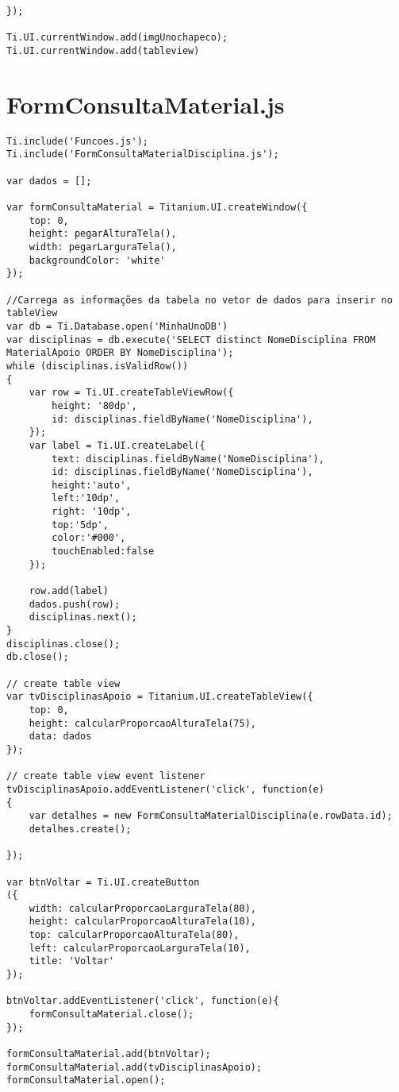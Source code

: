 \begin{lstlisting}
});

Ti.UI.currentWindow.add(imgUnochapeco);
Ti.UI.currentWindow.add(tableview)
\end{lstlisting}

\section{FormConsultaMaterial.js}
\begin{lstlisting}
Ti.include('Funcoes.js');
Ti.include('FormConsultaMaterialDisciplina.js');

var dados = [];

var formConsultaMaterial = Titanium.UI.createWindow({
	top: 0,
	height: pegarAlturaTela(),
	width: pegarLarguraTela(),
	backgroundColor: 'white'
});

//Carrega as informações da tabela no vetor de dados para inserir no tableView
var db = Ti.Database.open('MinhaUnoDB')
var disciplinas = db.execute('SELECT distinct NomeDisciplina FROM MaterialApoio ORDER BY NomeDisciplina');
while (disciplinas.isValidRow())
{
	var row = Ti.UI.createTableViewRow({
		height: '80dp',
		id: disciplinas.fieldByName('NomeDisciplina'),
	});
	var label = Ti.UI.createLabel({
		text: disciplinas.fieldByName('NomeDisciplina'),
		id: disciplinas.fieldByName('NomeDisciplina'),
		height:'auto',
		left:'10dp',
		right: '10dp',
		top:'5dp',
		color:'#000',
		touchEnabled:false
	});
	
	row.add(label)
	dados.push(row);
	disciplinas.next();
}
disciplinas.close();
db.close();

// create table view
var tvDisciplinasApoio = Titanium.UI.createTableView({
	top: 0,
	height: calcularProporcaoAlturaTela(75),
	data: dados
});
 
// create table view event listener
tvDisciplinasApoio.addEventListener('click', function(e)
{
    var detalhes = new FormConsultaMaterialDisciplina(e.rowData.id);
	detalhes.create();
    
});

var btnVoltar = Ti.UI.createButton
({
	width: calcularProporcaoLarguraTela(80),
	height: calcularProporcaoAlturaTela(10),
	top: calcularProporcaoAlturaTela(80),
    left: calcularProporcaoLarguraTela(10),
    title: 'Voltar'
});

btnVoltar.addEventListener('click', function(e){
	formConsultaMaterial.close();
});
		
formConsultaMaterial.add(btnVoltar);
formConsultaMaterial.add(tvDisciplinasApoio);
formConsultaMaterial.open();
\end{lstlisting}

